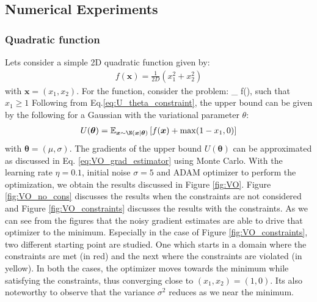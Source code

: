 \begin{itemize}
\subsection{Numerical Experiments}
\subsubsection{Quadratic function}
Lets consider a simple 2D quadratic function given by:
\begin{align}
	f(\bm{x}) = \frac{1}{2D}\left( x_1^2 + x_2^2\right)
\end{align}
with $\bm{x} = (x_1,x_2)$. For the function, consider the problem:
\be
\min_{} f(), \qquad \textrm{ such that $x_1 \geq 1$ }
\ee
%
Following from Eq.\ref{eq:U_theta_constraint}, the upper bound can be given by the following for a Gaussian with the variational parameter $\theta$:
\begin{align}
	U(\bm{\theta}) = \E_{\bm{x}\sim \N(\bm{x}\mid \bm{\theta})}\left[ f(\bm{x}) + \max (1-x_1,0)\right]
\end{align}
with $\bm{\theta} = (\mu,\sigma)$. The gradients of the upper bound $U(\bm{\theta})$ can be approximated as discussed in Eq. \ref{eq:VO_grad_estimator} using Monte Carlo. With the learning rate $\eta=0.1$, initial noise $\sigma = 5$ and ADAM optimizer to perform the optimization, we obtain the results discussed in Figure \ref{fig:VO}. Figure \ref{fig:VO_no_cons} discusses the results when the constraints are not considered and Figure \ref{fig:VO_constraints} discusses the results with the constraints. As we can see from the figures that the noisy gradient estimates are able to drive that optimizer to the minimum. Especially in the case of Figure \ref{fig:VO_constraints}, two different starting point are studied. One which starts in a domain where the constraints are met (in red) and the next where the constraints are violated (in yellow). In both the cases, the optimizer moves towards the minimum while satisfying the constraints, thus converging close to $(x_1,x_2)= (1,0)$. Its also noteworthy to observe that the variance $\sigma^2$ reduces as we near the minimum.  


\end{itemize}
